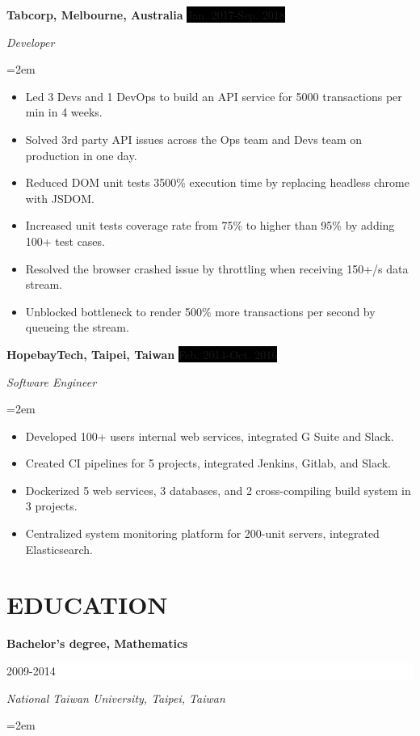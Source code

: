 \documentclass[a4paper, 11pt]{article}
\newcommand{\sepspace}{\vspace*{0.3em}}       %
\newcommand{\NewPart}[1]{\section*{\uppercase{#1}}}
\newcommand{\EducationEntry}[4]{
		\noindent \textbf{#1} \hfill      %
		\colorbox{White}{%
			\parbox{5cm}{%
			\hfill\color{Black}#2}} \par  %
		\noindent \textit{#3} \par        %
		\noindent\hangindent=2em\hangafter=0 \small #4 %
		\normalsize \par}
\newcommand{\WorkEntry}[4]{				  %
		\noindent \textbf{#1} \hfill      %
		\noindent\colorbox{Black}{\color{White}#2} \par  %
		\noindent \textit{#3} \par              %
		\noindent\hangindent=2em\hangafter=0 \small #4 %
		\normalsize \par}
\newcommand{\PrjEntry}[4]{				  %
		\noindent \textbf{#1} \hfill      %
		\noindent\colorbox{Black}{\color{White}#2} \par  %
		\noindent \textit{#3} \par              %
		\noindent\hangindent=2em\hangafter=0 \small #4 %
		\normalsize \par}
\begin{document}
\sepspace

\WorkEntry{Tabcorp, Melbourne, Australia}{Jan. 2017-Sep. 2018}{Developer}{
\begin{itemize}
	\item {Led 3 Devs and 1 DevOps to build an API service for 5000 transactions per min in 4 weeks.}
	\item {Solved 3rd party API issues across the Ops team and Devs team on production in one day.}
	\item {Reduced DOM unit tests 3500\% execution time by replacing headless chrome with JSDOM.}
	\item {Increased unit tests coverage rate from 75\% to higher than 95\% by adding 100+ test cases.}
	\item {Resolved the browser crashed issue by throttling when receiving 150+/s data stream.}
	\item {Unblocked bottleneck to render 500\% more transactions per second by queueing the stream.}
\end{itemize}
}

\sepspace

\WorkEntry{HopebayTech, Taipei, Taiwan}{Feb. 2014-Oct. 2016}{Software Engineer}{
\begin{itemize}
	\item {Developed 100+ users internal web services, integrated G Suite and Slack.}
	\item {Created CI pipelines for 5 projects, integrated Jenkins, Gitlab, and Slack.}
	\item {Dockerized 5 web services, 3 databases, and 2 cross-compiling build system in 3 projects.}
	\item {Centralized system monitoring platform for 200-unit servers, integrated Elasticsearch.}
\end{itemize}
}

\NewPart{Education}{}

\EducationEntry{Bachelor's degree, Mathematics}{2009-2014}
{National Taiwan University, Taipei, Taiwan}{}


\end{document}
